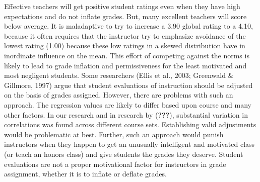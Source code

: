 \documentclass[man]{apa6}
\theoremstyle{definition}
\theoremstyle{definition}
\theoremstyle{definition}
\theoremstyle{remark}
\begin{document}
Effective teachers will get positive student ratings even when they have
high expectations and do not inflate grades. But, many excellent
teachers will score below average. It is maladaptive to try to increase
a 3.90 global rating to a 4.10, because it often requires that the
instructor try to emphasize avoidance of the lowest rating (1.00)
because these low ratings in a skewed distribution have in inordinate
influence on the mean. This effort of competing against the norms is
likely to lead to grade inflation and permissiveness for the least
motivated and most negligent students. Some researchers (Ellis et al.,
2003; Greenwald \& Gillmore, 1997) argue that student evaluations of
instruction should be adjusted on the basis of grades assigned. However,
there are problems with such an approach. The regression values are
likely to differ based upon course and many other factors. In our
research and in research by ({\textbf{???}}), substantial variation in
correlations was found across different course sets. Establishing valid
adjustments would be problematic at best. Further, such an approach
would punish instructors when they happen to get an unusually
intelligent and motivated class (or teach an honors class) and give
students the grades they deserve. Student evaluations are not a proper
motivational factor for instructors in grade assignment, whether it is
to inflate or deflate grades.
\end{document}
